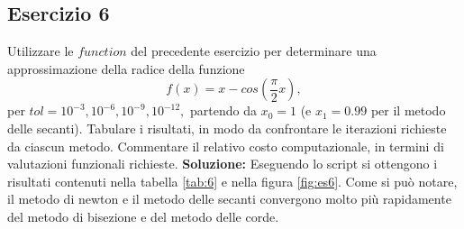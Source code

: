 \subsection{Esercizio 6}
Utilizzare le $function$ del precedente esercizio per determinare una approssimazione
della radice della funzione
\[
        f(x) = x - cos(\frac{\pi}{2}x),
\]
per $tol = 10^{-3}, 10^{-6}, 10^{-9}, 10^{-12},$ partendo da $x_0 = 1$
(e $x_1 = 0.99$ per il metodo delle secanti). Tabulare i risultati,
in modo da confrontare le iterazioni richieste da ciascun metodo. Commentare
il relativo costo computazionale, in termini di valutazioni funzionali richieste.
\newline \textbf{Soluzione:} \newline
Eseguendo lo script si ottengono i risultati contenuti nella tabella \ref{tab:6}
e nella figura \ref{fig:es6}. Come si può notare, il metodo di newton e il metodo delle secanti
convergono molto più rapidamente del metodo di bisezione e del metodo delle corde.
\begin{table}[h]
        \renewcommand\arraystretch{2}
        \caption{valori approssimati con i metodi di Newton, secanti e Steffensen}
        \label{tab:6}
\end{table}
